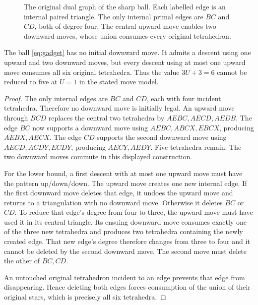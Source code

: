 \begin{figure}[ht]
\centering
{}
\caption{The original dual graph of the sharp ball. Each labelled edge is
an internal paired triangle. The only internal primal edges are $BC$ and
$CD$, both of degree four. The central upward move enables two downward
moves, whose union consumes every original tetrahedron.}
\label{fig:gadget}
\end{figure}

\begin{proposition}\label{prop:sharp}
The ball \eqref{eq:gadget} has no initial downward move. It admits a descent
using one upward and two downward moves, but every descent using at most
one upward move consumes all six original tetrahedra. Thus the value
$3U+3=6$ cannot be reduced to five at $U=1$ in the stated move model.
\end{proposition}
\begin{proof}
The only internal edges are $BC$ and $CD$, each with four incident
tetrahedra. Therefore no downward move is initially legal. An upward move
through $BCD$ replaces the central two tetrahedra by
$AEBC,AECD,AEDB$. The edge $BC$ now supports a downward move using
$AEBC,ABCX,EBCX$, producing $AEBX,AECX$. The edge $CD$ supports the second
downward move using $AECD,ACDY,ECDY$, producing $AECY,AEDY$. Five tetrahedra
remain. The two downward moves commute in this displayed construction.

For the lower bound, a first descent with at most one upward move must have
the pattern up/down/down. The upward move creates one new internal edge.
If the first downward move deletes that edge, it undoes the upward move
and returns to a triangulation with no downward move. Otherwise it deletes
$BC$ or $CD$. To reduce that edge's degree from four to three, the upward
move must have used it in its central triangle. Its ensuing downward move
consumes exactly one of the three new tetrahedra and produces two tetrahedra
containing the newly created edge. That new edge's degree therefore changes
from three to four and it cannot be deleted by the second downward move.
The second move must delete the other of $BC,CD$.

An untouched original tetrahedron incident to an edge prevents that edge
from disappearing. Hence deleting both edges forces consumption of the
union of their original stars, which is precisely all six tetrahedra.
\end{proof}

